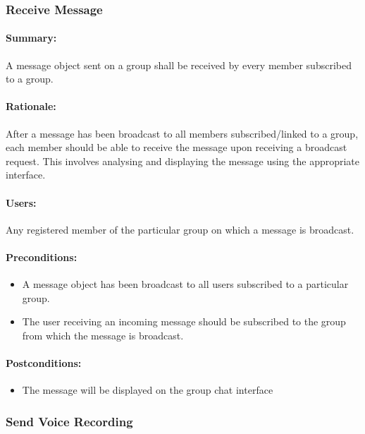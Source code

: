 \documentclass[11pt]{article}
\begin{document}
\subsubsection{Receive Message} \label{UC-receive-message}
\paragraph{Summary:} A message object sent on a group shall be received by every member subscribed to a group.
\paragraph{Rationale:} After a message has been broadcast to all members subscribed/linked to a group, each member should be able to receive the message upon receiving a broadcast request. This involves analysing and displaying the message using the appropriate interface. 
\paragraph{Users:} Any registered member of the particular group on which a message is broadcast.
\paragraph{Preconditions:} 
\begin{itemize}
\item A message object has been broadcast to all users subscribed to a particular group.
\item The user receiving an incoming message should be subscribed to the group from which the message is broadcast.
\end{itemize}
\paragraph{{Postconditions:}}
\begin{itemize}
\item The message will be displayed on the group chat interface
\end{itemize}

\subsubsection{Send Voice Recording} \label{UC-send-voice}
\end{document}
